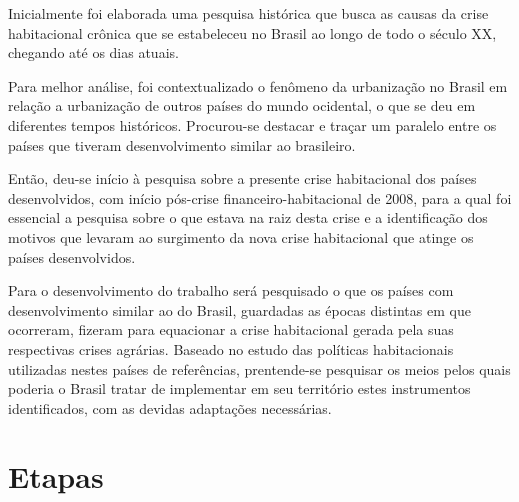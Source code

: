 \documentclass[
	12pt,				%
	oneside,			%
	a4paper,			%
	chapter=TITLE,		%
	section=TITLE,		%
	english,			%
	brazil				%
	]{abntex2}
\begin{document}
Inicialmente foi elaborada uma pesquisa histórica que busca as causas da crise
habitacional crônica que se estabeleceu no Brasil ao longo de todo o século XX,
chegando até os dias atuais.

Para melhor análise, foi contextualizado o fenômeno da urbanização no Brasil em
relação a urbanização de outros países do mundo ocidental, o que se deu em
diferentes tempos históricos. Procurou-se destacar e traçar um paralelo entre os
países que tiveram desenvolvimento similar ao brasileiro.

Então, deu-se início à pesquisa sobre a presente crise habitacional dos países
desenvolvidos, com início pós-crise financeiro-habitacional de 2008, para a
qual foi essencial a pesquisa sobre o que estava na raiz desta crise e a
identificação dos motivos que levaram ao surgimento da nova crise habitacional
que atinge os países desenvolvidos.

Para o desenvolvimento do trabalho será pesquisado o que os países com
desenvolvimento similar ao do Brasil, guardadas as épocas distintas em que
ocorreram, fizeram para equacionar a crise habitacional gerada pela suas
respectivas crises agrárias. Baseado no estudo das políticas habitacionais
utilizadas nestes países de referências, prentende-se pesquisar os meios pelos
quais poderia o Brasil tratar de implementar em seu território estes
instrumentos identificados, com as devidas adaptações necessárias.

\hypertarget{etapas}{%
\section{Etapas}\label{etapas}}
\end{document}
